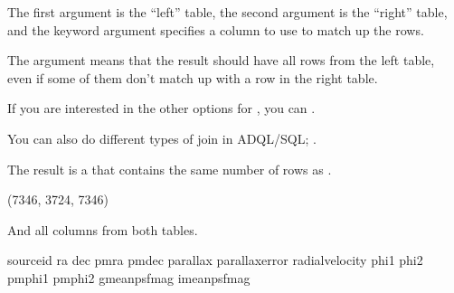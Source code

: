 \documentclass[letterpaper,10pt,english]{sphinxmanual}
\begin{document}
The first argument is the “left” table, the second argument is the “right” table, and the keyword argument  specifies a column to use to match up the rows.

The argument  means that the result should have all rows from the left table, even if some of them don’t match up with a row in the right table.

If you are interested in the other options for , you can .

You can also do different types of join in ADQL/SQL; .

The result is a  that contains the same number of rows as .

\begin{sphinxVerbatim}[commandchars=\\\{\}]
  
\end{sphinxVerbatim}

\begin{sphinxVerbatim}[commandchars=\\\{\}]
(7346, 3724, 7346)
\end{sphinxVerbatim}

And all columns from both tables.

\begin{sphinxVerbatim}[commandchars=\\\{\}]
   
\end{sphinxVerbatim}

\begin{sphinxVerbatim}[commandchars=\\\{\}]
source\PYGZus{}id
ra
dec
pmra
pmdec
parallax
parallax\PYGZus{}error
radial\PYGZus{}velocity
phi1
phi2
pm\PYGZus{}phi1
pm\PYGZus{}phi2
g\PYGZus{}mean\PYGZus{}psf\PYGZus{}mag
i\PYGZus{}mean\PYGZus{}psf\PYGZus{}mag
\end{sphinxVerbatim}
\end{document}
